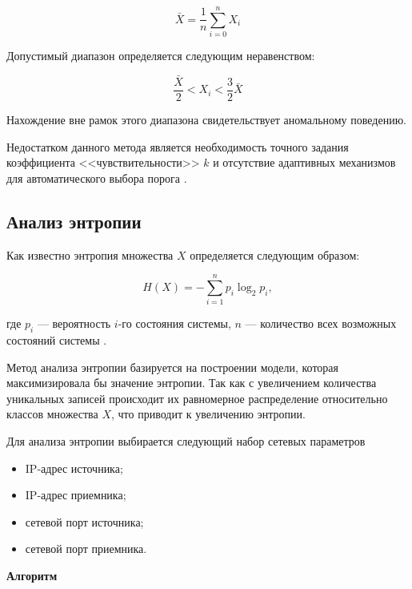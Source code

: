 \begin{equation}
    \bar{X} = \frac{1}{n} \sum_{i = 0}^{n} X_i
\end{equation}

Допустимый диапазон определяется следующим неравенством: 

\begin{equation}
    \frac{\bar{X}}{2} < X_i <  \frac{3}{2} \bar{X}
\end{equation}

Нахождение вне рамок этого диапазона свидетельствует аномальному поведению.

Недостатком данного метода является необходимость точного задания коэффициента <<чувствительности>> $k$ и отсутствие адаптивных механизмов для автоматического выбора порога \cite{fifthteen}.



\subsection*{Анализ энтропии}

Как известно энтропия множества $X$ определяется следующим образом: 

\begin{equation}
    H(X) = - \sum_{i = 1}^{n} p_i \log_2 p_i,
\end{equation}

где $p_i$ --- вероятность $i$-го состояния системы, $n$ --- количество всех возможных состояний системы \cite{fourteen}.

Метод анализа энтропии \cite{nine} базируется на построении модели, которая максимизировала бы значение энтропии. Так как с увеличением количества уникальных записей происходит их равномерное распределение относительно классов множества $X$, что приводит к увеличению энтропии. 

Для анализа энтропии выбирается следующий набор сетевых параметров 

\begin{itemize}
    \item IP-адрес источника;
    \item IP-адрес приемника;
    \item сетевой порт источника;
    \item сетевой порт приемника.
\end{itemize}

\textbf{Алгоритм}

